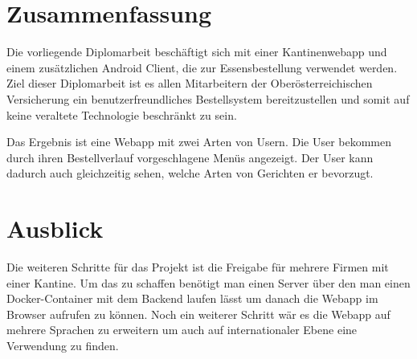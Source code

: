 \section{Zusammenfassung}
\author{Bozidar Spasenovic}
Die vorliegende Diplomarbeit beschäftigt sich mit einer Kantinenwebapp und einem zusätzlichen Android Client, die zur Essensbestellung
verwendet werden. Ziel dieser Diplomarbeit ist es allen Mitarbeitern der Oberösterreichischen Versicherung ein benutzerfreundliches Bestellsystem
bereitzustellen und somit auf keine veraltete Technologie beschränkt zu sein. 

Das Ergebnis ist eine Webapp mit zwei Arten von Usern. Die User bekommen durch ihren Bestellverlauf vorgeschlagene
Menüs angezeigt. Der User kann dadurch auch gleichzeitig sehen, welche Arten von Gerichten er bevorzugt.

\section{Ausblick}
Die weiteren Schritte für das Projekt ist die Freigabe für mehrere Firmen mit einer Kantine. Um das zu schaffen benötigt man einen Server
über den man einen Docker-Container mit dem Backend laufen lässt um danach die Webapp im Browser aufrufen zu können. Noch ein
weiterer Schritt wär es die Webapp auf mehrere Sprachen zu erweitern um auch auf internationaler Ebene eine Verwendung zu finden.